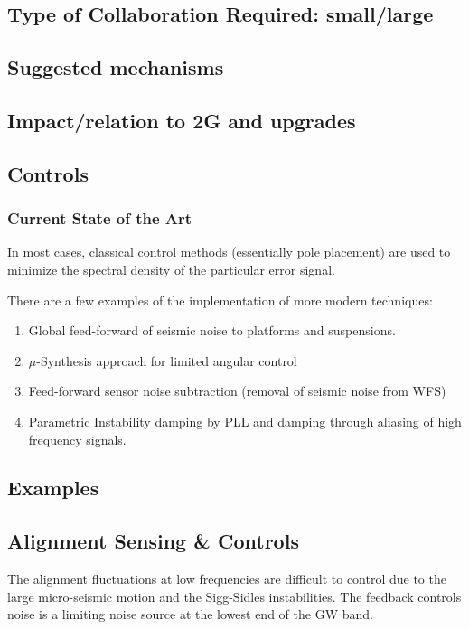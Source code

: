 \subsection{Type of Collaboration Required:  small/large}

\subsection{Suggested mechanisms}

\subsection{Impact/relation to 2G and upgrades}

\subsection{Controls}
\subsubsection{Current State of the Art}

In most cases, classical control methods (essentially pole placement)
are used to minimize the spectral density of the particular 
error signal.

There are a few examples of the implementation of more modern techniques:
\begin{enumerate}
\item Global feed-forward of seismic noise to platforms
      and suspensions.

\item $\mu$-Synthesis approach for limited angular control

\item Feed-forward sensor noise subtraction 
      (removal of seismic noise from WFS)

\item Parametric Instability damping by PLL and damping through 
      aliasing of high frequency signals.
\end{enumerate}

\subsection{Examples}

\subsection{Alignment Sensing \& Controls}
The alignment fluctuations at low frequencies are difficult to control due to the large micro-seismic motion and the Sigg-Sidles instabilities. The feedback controls noise is a limiting noise source at the lowest end of the GW band.

